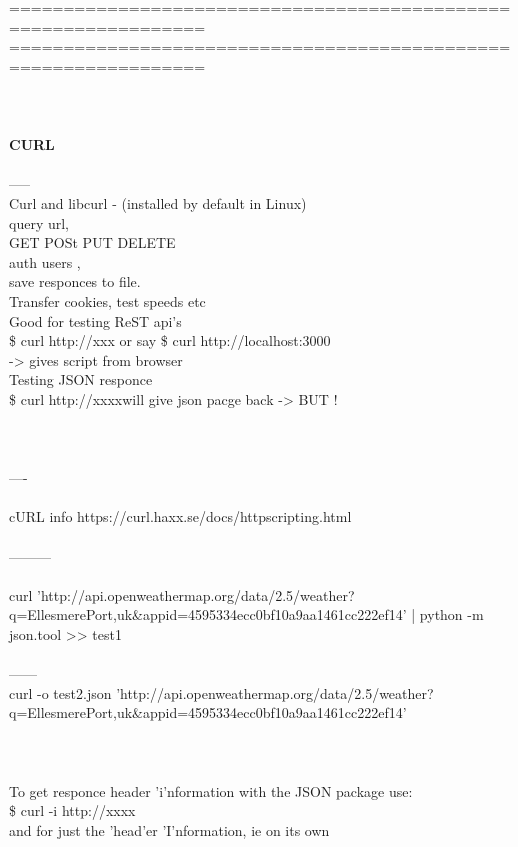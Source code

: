 \documentclass[10pt,a4paper]{article}
\begin{document}
{{{{{{{{{================================================================\\
================================================================\\
\\
\\
\\
}\textbf{{\Large CURL\\
}}{\large \\
-----\\
Curl and libcurl - (installed by default in Linux)\\
query url, \\
GET POSt PUT DELETE\\
auth users , \\
save responces to file.\\
Transfer cookies, test speeds etc\\
Good for testing ReST api's\\
\$ curl http://}{\large  xxx    or say  \$ curl http://localhost:3000}{\large \\
-> gives script from browser\\
Testing JSON responce\\
\$ curl http://xxxx}{\large    will give json pacge back -> BUT !\\
\\
\\
\\
----\\
\\
cURL info  https://curl.haxx.se/docs/httpscripting.html}{\large \\
\\
---------\\
\\
curl 'http://api.openweathermap.org/data/2.5/weather?q=Ellesmere}{\large  Port,uk\&appid=4595334ecc0bf10a9aa1461cc222ef14' | python -m json.tool >> test1\\
\\
------\\
curl -o test2.json 'http://api.openweathermap.org/data/2.5/weather?q=Ellesmere}{\large  Port,uk\&appid=4595334ecc0bf10a9aa1461cc222ef14'\\
\\
\\
\\
To get responce header 'i'nformation with the JSON package use:\\
\$  curl -i http://xxxx}{\large \\
and for just the 'head'er 'I'nformation, ie on its own\\
}}}}}}}}}
\end{document}
